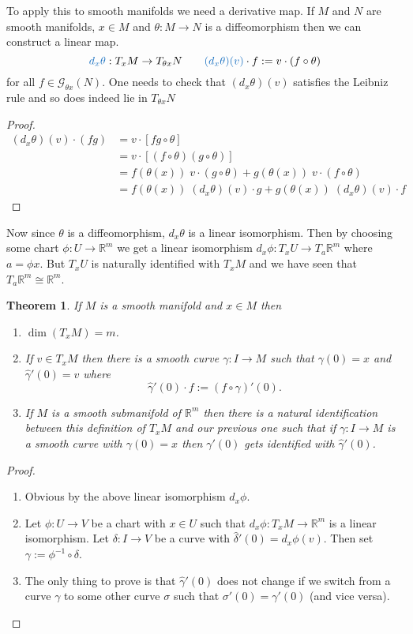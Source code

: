 \documentclass[11pt]{article}
\newcommand{\defeq}{:=}
\newcommand{\R}{\mathbb{R}}
\newcommand{\mdf}[1]{{\color{RoyalBlue} #1}}
\newtheorem{theorem}{Theorem}[section]
\begin{document}
To apply this to smooth manifolds we need a derivative map.
If $M$ and $N$ are smooth manifolds, $x\in M$ and $\theta: M \to N$ is a diffeomorphism then we can construct a linear map.
\[
	\mdf{d_x\theta}:T_xM \to T_{\theta x}N \quad \quad \mdf{(d_x\theta)(v)}\cdot f \defeq v \cdot (f\circ \theta)
\]
for all $f\in\mathcal{G}_{\theta x}(N)$.
One needs to check that $(d_x\theta)(v)$ satisfies the Leibniz rule and so does indeed lie in $T_{\theta x}N$

\begin{proof}
\begin{align*}
	(d_x\theta)(v) \cdot (fg) &= v \cdot \left[ fg \circ \theta\right] \\
							  &= v\cdot \left[ (f \circ \theta) (g\circ \theta)\right] \\
							  & = f(\theta(x)) \; v\cdot (g\circ \theta) + g(\theta(x)) \; v \cdot (f\circ \theta)\\
							  & = f(\theta(x)) \; (d_x\theta)(v) \cdot g + g(\theta(x)) \; (d_x\theta)(v) \cdot f
\end{align*}
\end{proof}

Now since $\theta$ is a diffeomorphism, $d_x\theta$ is a linear isomorphism.
Then by choosing some chart $\phi : U \to \R^m$ we get a linear isomorphism $d_x\phi: T_xU \to T_a\R^m$ where $a=\phi x$.
But $T_xU$ is naturally identified with $T_xM$ and we have seen that $T_a\R^m\cong \R^m$.

\begin{theorem}
If $M$ is a smooth manifold and $x\in M$ then
\begin{enumerate}
	\item $\dim (T_xM)=m$.
	\item If $v\in T_xM$ then there is a smooth curve $\gamma:I \to M$ such that $\gamma(0) = x$ and $\hat{\gamma}'(0)=v$ where
		\[
			\hat{\gamma}'(0) \cdot f \defeq (f\circ \gamma)'(0).
		\]
	\item If $M$ is a smooth submanifold of $\R^m$ then there is a natural identification between this definition of $T_xM$ and our previous one such that if $\gamma: I \to M$ is a smooth curve with $\gamma(0)=x$ then $\gamma'(0)$ gets identified with $\hat{\gamma}'(0)$.
\end{enumerate}
\end{theorem}

\begin{proof}
\begin{enumerate}
	\item Obvious by the above linear isomorphism $d_x\phi$.
	\item Let $\phi: U \to V$ be a chart with $x\in U$ such that $d_x\phi:T_xM \to \R^m$ is a linear isomorphism.
		Let $\delta: I \to V$ be a curve with $\hat{\delta}'(0) = d_x\phi(v)$.
		Then set $\gamma \defeq \phi^{-1} \circ \delta$.
	\item The only thing to prove is that $\hat{\gamma}'(0)$ does not change if we switch from a curve $\gamma$ to some other curve $\sigma$ such that $\sigma'(0) = \gamma'(0)$ (and vice versa).
\end{enumerate}
\end{proof}
\end{document}
